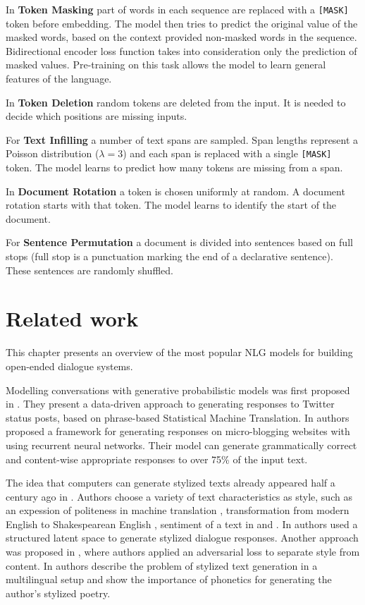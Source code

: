 In \textbf{Token Masking} part of words in each sequence are replaced with a \texttt{[MASK]} token before embedding. The model then tries to predict the original value of the masked words, based on the context provided non-masked words in the sequence. Bidirectional encoder loss function takes into consideration only the prediction of masked values. Pre-training on this task allows the model to learn general features of the language.

In \textbf{Token Deletion} random tokens are deleted from the input. It is needed to decide which positions are missing inputs.

For \textbf{Text Infilling} a number of text spans are sampled. Span lengths represent a Poisson distribution ($\lambda=3$) and each span is replaced with a single \texttt{[MASK]} token. The model learns to predict how many tokens are missing from a span.

In \textbf{Document Rotation} a token is chosen uniformly at random. A document rotation starts with that token. The model learns to identify the start of the document.

For \textbf{Sentence Permutation} a document is divided into sentences based on full stops (full stop is a punctuation marking the end of a declarative sentence). These sentences are randomly shuffled.

\chapter{Related work} \label{related_work}
This chapter presents an overview of the most popular NLG models for building open-ended dialogue systems. 

Modelling conversations with generative probabilistic models was first proposed in \cite{ritter2011data}. They present a data-driven approach to generating responses to Twitter status posts, based on phrase-based Statistical Machine Translation. In \cite{shang2015neural} authors proposed a framework for generating responses on micro-blogging websites with using recurrent neural networks. Their model can generate grammatically correct and content-wise appropriate responses to over 75\% of the input text. 

The idea that computers can generate stylized texts already appeared half a century ago in \cite{wheatley1965computer}. Authors choose a variety of text characteristics as style, such as an expession of politeness in machine translation \cite{sennrich2016controlling}, transformation from modern English to Shakespearean English \cite{jhamtani2017shakespearizing}, sentiment of a text in \cite{shen2017style} and \cite{li2018delete}. In \cite{gao2019structuring} authors used a structured latent space to generate stylized dialogue responses. Another approach was proposed in \cite{john2018disentangled}, where authors applied an adversarial loss to separate style from content. In \cite{tikhonov2018guess} authors describe the problem of stylized text generation in a multilingual setup and show the importance of phonetics for generating the author's stylized poetry.


